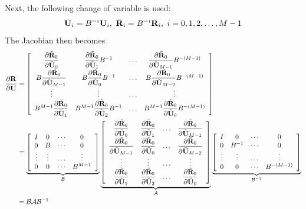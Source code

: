 \documentclass[journal,final]{new-aiaa}
\begin{document}
Next, the following change of variable is used:
\begin{equation*}
\tilde {\mathbf{U}}_i = B^{-i} \mathbf{U}_i,~\tilde {\mathbf{R}}_i = B^{-i} \mathbf{R}_i,~i=0,1,2,\dots,M-1
\end{equation*}
The Jacobian then becomes
\begin{align}
\df{\R}{\U}
&=
\left[
\begin{array}{cccc}
\df{\tilde \R_0}{\tilde \U_0} &
\df{\tilde \R_0}{\tilde \U_1} B^{-1}&
\dots &
 \df{\tilde \R_0}{\tilde \U_{M-1}}B^{-(M-1)}\\   
B\df{\tilde \R_0}{\tilde \U_{M-1}} &
B\df{\tilde \R_0}{\tilde \U_0} B^{-1}&
\dots 
&B \df{\tilde \R_0}{\tilde \U_{M-2}}B^{-(M-1)}\\   
\vdots &\vdots &\dots & \vdots\\   
B^{M-1}\df{\tilde \R_{0}}{\tilde \U_1} &
B^{M-1}\df{\tilde \R_{0}}{\tilde \U_2}B^{-1} &
\dots &
 B^{M-1}\df{\tilde \R_{0}}{\tilde \U_{0}}B^{-(M-1)}
\end{array}
\right]\\
&=
\underbrace{
\left[
\begin{array}{cccc}
I & 0  & \cdots & 0\\
0 & B & \cdots  & 0\\
\vdots&\vdots &\dots & \vdots\\
0 &  0 & \cdots & B^{M-1}
\end{array}
\right]
}_{ \mathcal {B}  }
\underbrace{
\left[
\begin{array}{cccc}
\df{\tilde \R_0}{\tilde \U_0}&
\df{\tilde \R_0}{\tilde \U_1}&
\dots &
\df{\tilde \R_0}{\tilde \U_{M-1}}\\   
\df{\tilde \R_0}{\tilde \U_{M-1}}&
\df{\tilde \R_0}{\tilde \U_0}&
\dots &
\df{\tilde \R_0}{\tilde \U_{M-2}}\\   
\vdots&
\vdots&
\dots &
\vdots\\   
\df{\tilde \R_{0}}{\tilde \U_1}&
\df{\tilde \R_{0}}{\tilde \U_2}&
\dots &
\df{\tilde \R_{0}}{\tilde \U_0}
\end{array}
\right]
}_{ \mathcal {A}  }
\underbrace{
\left[
\begin{array}{cccc}
I & 0 & \cdots & 0\\
0 & B^{-1}  & \cdots  & 0\\
\vdots&\vdots &\dots & \vdots\\
0 & 0  & \cdots & B^{-(M-1)}
\end{array}
\right]
}_{ \mathcal {B}^{-1}  }
\\
&= \mathcal {B}  \mathcal {A} \mathcal {B}^{-1}
\end{align}
\end{document}
